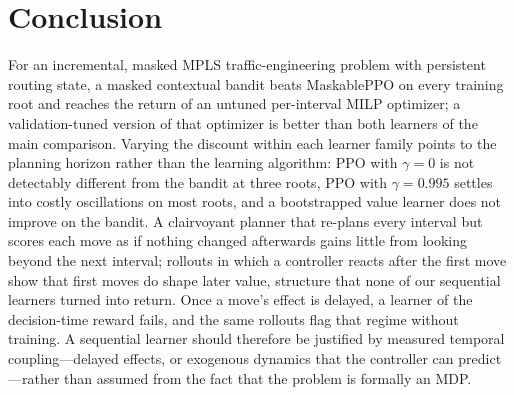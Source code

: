 \section{Conclusion}
\label{sec:conclusion}

For an incremental, masked MPLS traffic-engineering problem with persistent
routing state, a masked contextual bandit beats MaskablePPO on every training
root and reaches the return of an untuned per-interval MILP optimizer; a
validation-tuned version of that optimizer is better than both learners of
the main comparison. Varying the
discount within each learner family points to the planning horizon rather than
the learning algorithm: PPO with $\gamma=0$ is not detectably different from the bandit at three roots, PPO with
$\gamma=0.995$ settles into costly oscillations on most roots, and a
bootstrapped value learner does not improve on the bandit. A clairvoyant planner
that re-plans every interval but scores each move as if nothing changed
afterwards gains little from looking beyond the next interval; rollouts in
which a controller reacts after the first move show that first moves do shape
later value, structure that none of our sequential learners turned into
return. Once a move's effect is delayed, a learner of the decision-time reward
fails, and the same rollouts flag that regime without training. A sequential learner should therefore be justified by measured temporal
coupling---delayed effects, or exogenous dynamics that the controller can
predict---rather than assumed from the fact that the problem is formally an
MDP.
